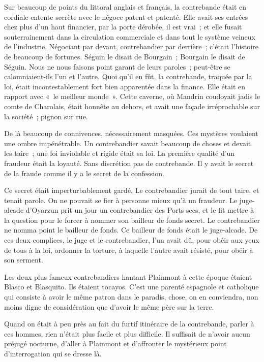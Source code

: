 \documentclass[french,twoside]{book} %
\begin{document}
Sur beaucoup de points du littoral anglais et français, la contrebande était en cordiale entente secrète avec le négoce patent et patenté. Elle avait ses entrées chez plus d’un haut financier, par la porte dérobée, il est vrai ; et elle fusait souterrainement dans la circulation commerciale et dans tout le système veineux de l’industrie. Négociant par devant, contrebandier par derrière ; c’était l’histoire de beaucoup de fortunes. Séguin le disait de Bourgain ; Bourgain le disait de Séguin. Nous ne nous faisons point garant de leurs paroles ; peut-être se calomniaient-ils l’un et l’autre. Quoi qu’il en fût, la contrebande, traquée par la loi, était incontestablement fort bien apparentée dans la finance. Elle était en rapport avec « le meilleur monde ». Cette caverne, où Mandrin coudoyait jadis le comte de Charolais, était honnête au dehors, et avait une façade irréprochable sur la société ; pignon sur rue.\par
De là beaucoup de connivences, nécessairement masquées. Ces mystères voulaient une ombre impénétrable. Un contrebandier savait beaucoup de choses et devait les taire ; une foi inviolable et rigide était sa loi. La première qualité d’un fraudeur était la loyauté. Sans discrétion pas de contrebande. Il y avait le secret de la fraude comme il y a le secret de la confession.\par
 Ce secret était imperturbablement gardé. Le contrebandier jurait de tout taire, et tenait parole. On ne pouvait se fier à personne mieux qu’à un fraudeur. Le juge-alcade d’Oyarzun prit un jour un contrebandier des Ports secs, et le fit mettre à la question pour le forcer à nommer son bailleur de fonds secret. Le contrebandier ne nomma point le bailleur de fonds. Ce bailleur de fonds était le juge-alcade. De ces deux complices, le juge et le contrebandier, l’un avait dû, pour obéir aux yeux de tous à la loi, ordonner la torture, à laquelle l’autre avait résisté, pour obéir à son serment.\par
Les deux plus fameux contrebandiers hantant Plainmont à cette époque étaient Blasco et Blasquito. Ils étaient tocayos. C’est une parenté espagnole et catholique qui consiste à avoir le même patron dans le paradis, chose, on en conviendra, non moins digne de considération que d’avoir le même père sur la terre.\par
Quand on était à peu près au fait du furtif itinéraire de la contrebande, parler à ces hommes, rien n’était plus facile et plus difficile. Il suffisait de n’avoir aucun préjugé nocturne, d’aller à Plainmont et d’affronter le mystérieux point d’interrogation qui se dresse là.
\end{document}
